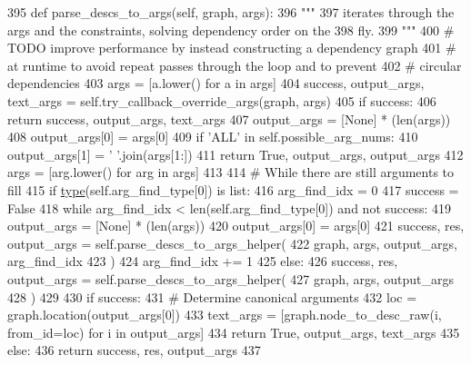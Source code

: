 \begin{DoxyCode}
395     \textcolor{keyword}{def }parse\_descs\_to\_args(self, graph, args):
396         \textcolor{stringliteral}{"""}
397 \textcolor{stringliteral}{        iterates through the args and the constraints, solving dependency order on the}
398 \textcolor{stringliteral}{        fly.}
399 \textcolor{stringliteral}{        """}
400         \textcolor{comment}{# TODO improve performance by instead constructing a dependency graph}
401         \textcolor{comment}{# at runtime to avoid repeat passes through the loop and to prevent}
402         \textcolor{comment}{# circular dependencies}
403         args = [a.lower() \textcolor{keywordflow}{for} a \textcolor{keywordflow}{in} args]
404         success, output\_args, text\_args = self.try\_callback\_override\_args(graph, args)
405         \textcolor{keywordflow}{if} success:
406             \textcolor{keywordflow}{return} success, output\_args, text\_args
407         output\_args = [\textcolor{keywordtype}{None}] * (len(args))
408         output\_args[0] = args[0]
409         \textcolor{keywordflow}{if} \textcolor{stringliteral}{'ALL'} \textcolor{keywordflow}{in} self.possible\_arg\_nums:
410             output\_args[1] = \textcolor{stringliteral}{' '}.join(args[1:])
411             \textcolor{keywordflow}{return} \textcolor{keyword}{True}, output\_args, output\_args
412         args = [arg.lower() \textcolor{keywordflow}{for} arg \textcolor{keywordflow}{in} args]
413 
414         \textcolor{comment}{# While there are still arguments to fill}
415         \textcolor{keywordflow}{if} \hyperlink{namespaceparlai_1_1agents_1_1tfidf__retriever_1_1build__tfidf_ad5dfae268e23f506da084a9efb72f619}{type}(self.arg\_find\_type[0]) \textcolor{keywordflow}{is} list:
416             arg\_find\_idx = 0
417             success = \textcolor{keyword}{False}
418             \textcolor{keywordflow}{while} arg\_find\_idx < len(self.arg\_find\_type[0]) \textcolor{keywordflow}{and} \textcolor{keywordflow}{not} success:
419                 output\_args = [\textcolor{keywordtype}{None}] * (len(args))
420                 output\_args[0] = args[0]
421                 success, res, output\_args = self.parse\_descs\_to\_args\_helper(
422                     graph, args, output\_args, arg\_find\_idx
423                 )
424                 arg\_find\_idx += 1
425         \textcolor{keywordflow}{else}:
426             success, res, output\_args = self.parse\_descs\_to\_args\_helper(
427                 graph, args, output\_args
428             )
429 
430         \textcolor{keywordflow}{if} success:
431             \textcolor{comment}{# Determine canonical arguments}
432             loc = graph.location(output\_args[0])
433             text\_args = [graph.node\_to\_desc\_raw(i, from\_id=loc) \textcolor{keywordflow}{for} i \textcolor{keywordflow}{in} output\_args]
434             \textcolor{keywordflow}{return} \textcolor{keyword}{True}, output\_args, text\_args
435         \textcolor{keywordflow}{else}:
436             \textcolor{keywordflow}{return} success, res, output\_args
437 
\end{DoxyCode}
